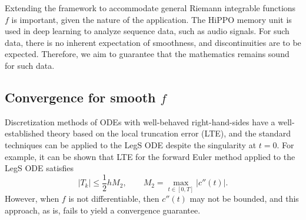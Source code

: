 \documentclass{article}
\theoremstyle{definition}
\begin{document}

Extending the framework to accommodate general Riemann integrable functions $f$ is important, given the nature of the application. The HiPPO memory unit is used in deep learning to analyze sequence data, such as audio signals. For such data, there is no inherent expectation of smoothness, and discontinuities are to be expected. Therefore, we aim to guarantee that the mathematics remains sound for such data.










\subsection{Convergence for smooth $f$} \label{subsec:smooth_f}
Discretization methods of ODEs with well-behaved right-hand-sides have a well-established theory based on the local truncation error (LTE), and the standard techniques can be applied to the LegS ODE despite the singularity at $t=0$. For example, it can be shown that LTE for the forward Euler method applied to the LegS ODE satisfies
\[
|T_k| \leq \frac{1}{2} h M_2, \qquad M_2 = \max_{t \in [0, T]} |c''(t)|.
\]
However, when $f$ is not differentiable, then $c''(t)$ may not be bounded, and this approach, as is, fails to yield a convergence guarantee.
\end{document}
